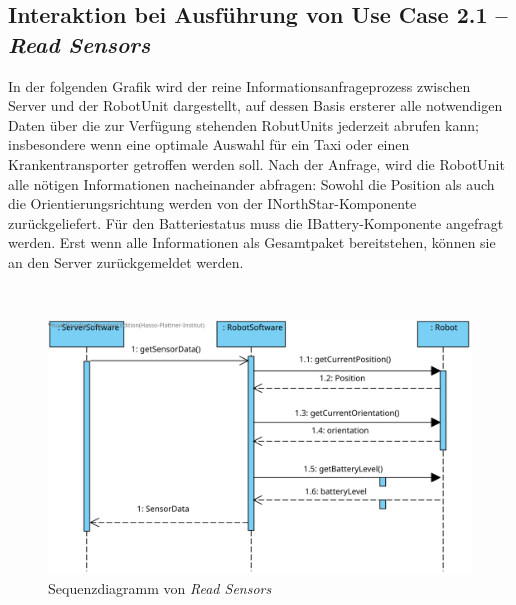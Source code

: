 	\subsection*{Interaktion bei Ausführung von Use Case 2.1 – \emph{Read Sensors}}
In der folgenden Grafik wird der reine Informationsanfrageprozess zwischen Server und der RobotUnit dargestellt, auf dessen Basis ersterer alle notwendigen Daten über die zur Verfügung stehenden RobutUnits jederzeit abrufen kann; insbesondere wenn eine optimale Auswahl für ein Taxi oder einen Krankentransporter getroffen werden soll. Nach der Anfrage, wird die RobotUnit alle nötigen Informationen nacheinander abfragen: Sowohl die Position als auch die Orientierungsrichtung werden von der INorthStar-Komponente zurückgeliefert. Für den Batteriestatus muss die IBattery-Komponente angefragt werden. Erst wenn alle Informationen als Gesamtpaket bereitstehen, können sie an den Server zurückgemeldet werden.

\\

	\begin{figure}[H]
		\centering
		\includegraphics[width=1\textwidth]{img/0-Entwurf-8-ReadSens}
		\caption{Sequenzdiagramm von \emph{Read Sensors}}
		\label{ReadSensors}
	\end{figure}

	
